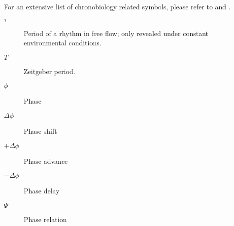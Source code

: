 \begin{simbolos}

For an extensive list of chronobiology related symbols, please refer to
\textcite{aschoff1965} and \textcite{marques2012}.

\begin{description}
\item[\(\tau\)]
\hspace{20cm}

Period of a rhythm in free flow; only revealed under constant
environmental conditions.
\item[\(T\)]
\hspace{20cm}

Zeitgeber period.
\item[\(\phi\)]
\hspace{20cm}

Phase
\item[\(\Delta\phi\)]
\hspace{20cm}

Phase shift
\item[\(+\Delta\phi\)]
\hspace{20cm}

Phase advance
\item[\(-\Delta\phi\)]
\hspace{20cm}

Phase delay
\item[\(\Psi\)]
\hspace{20cm}

Phase relation
\end{description}

\end{simbolos}


